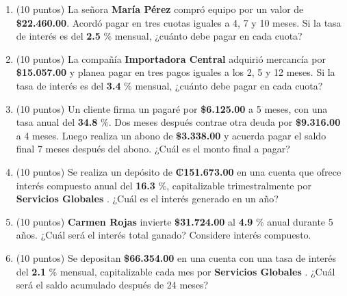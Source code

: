 \documentclass[10pt]{article}
\begin{document}
\begin{enumerate}[leftmargin=*, label=\textbf{\arabic*.}]
  \item (10 puntos) La señora \textbf{ María Pérez } compró equipo por un valor de \textbf{\$\num{ 22,460.00 }}. Acordó pagar en tres cuotas iguales a 4, 7 y 10 meses. Si la tasa de interés es del \textbf{ 2.5 }\% mensual, ¿cuánto debe pagar en cada cuota?

  \vspace{0.5cm}

  \item (10 puntos) La compañía \textbf{ Importadora Central } adquirió mercancía por \textbf{\$\num{ 15,057.00 }} y planea pagar en tres pagos iguales a los 2, 5 y 12 meses. Si la tasa de interés es del \textbf{ 3.4 }\% mensual, ¿cuánto debe pagar en cada cuota?

  \vspace{0.5cm}

  \item (10 puntos) Un cliente firma un pagaré por \textbf{\$\num{ 6,125.00 }} a 5 meses, con una tasa anual del \textbf{ 34.8 }\%. Dos meses después contrae otra deuda por \textbf{\$\num{ 9,316.00 }} a 4 meses. Luego realiza un abono de \textbf{\$\num{ 3,338.00 }} y acuerda pagar el saldo final 7 meses después del abono. ¿Cuál es el monto final a pagar?

  \vspace{0.5cm}

  \item (10 puntos) Se realiza un depósito de \textbf{₡\num{ 151.673.00 }} en una cuenta que ofrece interés compuesto anual del \textbf{ 16.3 }\%, capitalizable trimestralmente por \textbf{ Servicios Globales }. ¿Cuál es el interés generado en un año?

  \vspace{0.5cm}

  \item (10 puntos) \textbf{ Carmen Rojas } invierte \textbf{\$\num{ 31,724.00 }} al \textbf{ 4.9 }\% anual durante 5 años. ¿Cuál será el interés total ganado? Considere interés compuesto.

  \vspace{0.5cm}

  \item (10 puntos) Se depositan \textbf{\$\num{ 66,354.00 }} en una cuenta con una tasa de interés del \textbf{ 2.1 }\% mensual, capitalizable cada mes por \textbf{ Servicios Globales }. ¿Cuál será el saldo acumulado después de 24 meses?
\end{enumerate}
\end{document}
